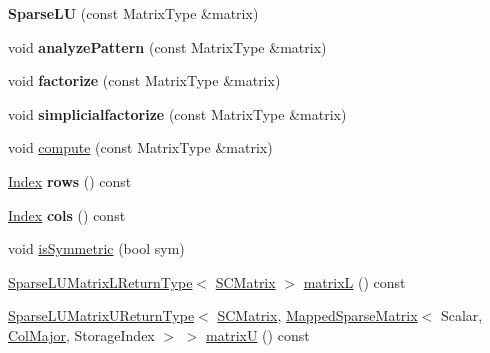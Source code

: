 \begin{DoxyCompactItemize}
{\bfseries Sparse\+LU} (const Matrix\+Type \&matrix)
\item 
\mbox{\label{group___sparse_l_u___module_a47122a37e9c6c275b8a0b7bd44aaf8ac}} 
void {\bfseries analyze\+Pattern} (const Matrix\+Type \&matrix)
\item 
\mbox{\label{group___sparse_l_u___module_a94df11f088f03f8d83e299b12c635387}} 
void {\bfseries factorize} (const Matrix\+Type \&matrix)
\item 
\mbox{\label{group___sparse_l_u___module_a4841f300341aab4999881ce7f6e38b40}} 
void {\bfseries simplicialfactorize} (const Matrix\+Type \&matrix)
\item 
void \hyperlink{group___sparse_l_u___module_a96a8dcb02015ab9be5777d4ba9173266}{compute} (const Matrix\+Type \&matrix)
\item 
\mbox{\label{group___sparse_l_u___module_a5d4cc6663767bbed1efd278480ee2975}} 
\hyperlink{namespace_eigen_a62e77e0933482dafde8fe197d9a2cfde}{Index} {\bfseries rows} () const
\item 
\mbox{\label{group___sparse_l_u___module_a634e903f97c46b55591db2e12d1d45d1}} 
\hyperlink{namespace_eigen_a62e77e0933482dafde8fe197d9a2cfde}{Index} {\bfseries cols} () const
\item 
void \hyperlink{group___sparse_l_u___module_afff3bd506cd78172e5219c707562729f}{is\+Symmetric} (bool sym)
\item 
\hyperlink{struct_eigen_1_1_sparse_l_u_matrix_l_return_type}{Sparse\+L\+U\+Matrix\+L\+Return\+Type}$<$ \hyperlink{group___sparse_l_u___module}{S\+C\+Matrix} $>$ \hyperlink{group___sparse_l_u___module_a634abe55e5a076f2e10db78871105a8f}{matrixL} () const
\item 
\hyperlink{struct_eigen_1_1_sparse_l_u_matrix_u_return_type}{Sparse\+L\+U\+Matrix\+U\+Return\+Type}$<$ \hyperlink{group___sparse_l_u___module}{S\+C\+Matrix}, \hyperlink{class_eigen_1_1_mapped_sparse_matrix}{Mapped\+Sparse\+Matrix}$<$ Scalar, \hyperlink{group__enums_ggaacded1a18ae58b0f554751f6cdf9eb13a0cbd4bdd0abcfc0224c5fcb5e4f6669a}{Col\+Major}, Storage\+Index $>$ $>$ \hyperlink{group___sparse_l_u___module_aaf395a8fca527144215ff19cc7b8b637}{matrixU} () const
\item 

\end{DoxyCompactItemize}
